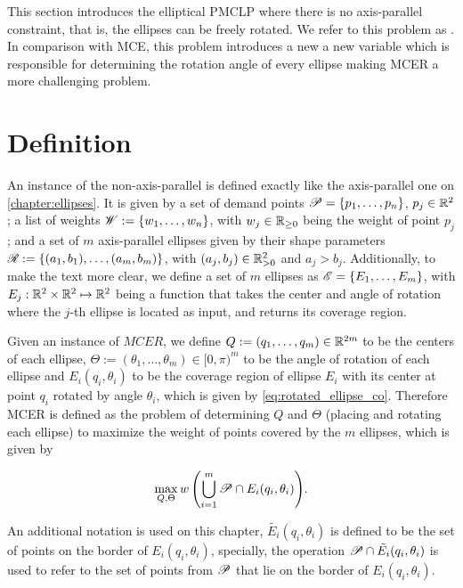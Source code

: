 This section introduces the elliptical PMCLP where there is no axis-parallel constraint, that is, the ellipses can be freely rotated. We refer to this problem as . In comparison with MCE, this problem introduces a new a new variable which is responsible for determining the rotation angle of every ellipse making MCER a more challenging problem.

\section{Definition}

An instance of the non-axis-parallel is defined exactly like the axis-parallel one on \autoref{chapter:ellipses}. It is given by a set of demand points $\mathscr{P}=\{p_1, \dots, p_n\}$, $p_j\in\mathbb{R}^2$; a list of weights $\mathscr{W}:=\{w_1, \dots, w_n\}$, with $w_j\in\mathbb{R}_{\ge0}$ being the weight of point $p_j$;
and a set of $m$ axis-parallel ellipses given by their shape parameters $\mathscr{R}:=\{(a_1, b_1), \dots, (a_m, b_m)\}$, with $(a_j, b_j)\in\mathbb{R}_{>0}^2$ and $a_j>b_j$.
Additionally, to make the text more clear, we define a set of $m$ ellipses as $\mathscr{E} = \{E_1, \dots, E_m\}$, with $E_j : \mathbb{R}^2\times\mathbb{R}^2 \mapsto \mathbb{R}^2$ being a function that takes the center and angle of rotation where the $j$-th ellipse is located as input, and returns its coverage region.

Given an instance of $MCER$, we define $Q:=(q_1, \dots, q_m) \in \mathbb{R}^{2m}$ to be the centers of each ellipse, $\Theta:=(\theta_1, \dots, \theta_m) \in [0, \pi)^m$ to be the angle of rotation of each ellipse and $E_i(q_i, \theta_i)$ to be the coverage region of ellipse $E_i$ with its center at point $q_i$ rotated by angle $\theta_i$, which is given by \autoref{eq:rotated_ellipse_co}. Therefore MCER is defined as the problem of determining $Q$ and $\Theta$ (placing and rotating each ellipse) to maximize the weight of points covered by the $m$ ellipses, which is given by

\begin{equation}\label{eq:optMCEn}
\max_{Q, \Theta}{w\left(\bigcup_{i=1}^{m} \mathscr{P} \cap E_i(q_i, \theta_i)\right)}.
\end{equation}

An additional notation is used on this chapter, $\tilde{E_i}(q_i, \theta_i)$ is defined to be the set of points on the border of $E_i(q_i, \theta_i)$, specially, the operation $\mathscr{P} \cap \tilde{E_i}(q_i, \theta_i)$ is used to refer to the set of points from $\mathscr{P}$ that lie on the border of $E_i(q_i, \theta_i)$.


